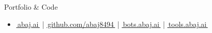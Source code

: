 \documentclass[]{mcdowellcv}
\newcommand{\linkarrow}{\,\raisebox{0.15ex}{\footnotesize$\nearrow$}} %
\begin{document}
\begin{cvsection}{Portfolio \& Code}
  \begin{cvsubsection}{}{}{}
    \begin{itemize}
      \item \href{https://abaj.ai}{\,abaj.ai\linkarrow}
            \;|\;
            \href{https://github.com/abaj8494}{\,github.com/abaj8494\linkarrow}
            \;|\;
            \href{https://bots.abaj.ai}{\,bots.abaj.ai\linkarrow}
            \;|\;
            \href{https://tools.abaj.ai}{\,tools.abaj.ai\linkarrow}
    \end{itemize}
  \end{cvsubsection}
\end{cvsection}

\end{document}
